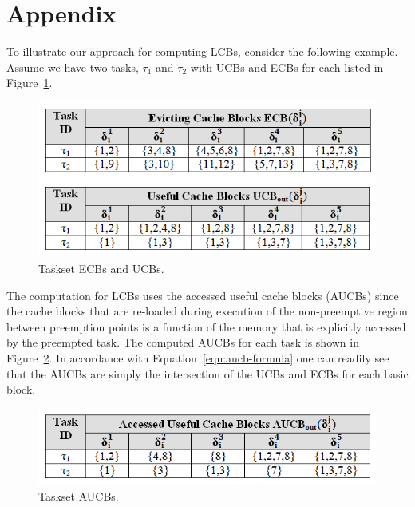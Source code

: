 %
\clearpage
%
\section{Appendix}\label{sec:appendix}

To illustrate our approach for computing LCBs, consider the following example.  Assume we have two tasks, \begin{math}\tau_{1}\end{math} and \begin{math}\tau_{2}\end{math} with UCBs and ECBs for each listed in Figure~\ref{fig:taskset_ecbs_ucbs}.
\vspace{-5pt}
\begin{figure}[h!]
\begin{center}
\includegraphics[width=\linewidth]{taskset_ecbs_ucbs.png}
\caption{Taskset ECBs and UCBs.}
\label{fig:taskset_ecbs_ucbs}
\end{center}
\end{figure}
\vspace{-10pt}
\newline
\noindent
The computation for LCBs uses the accessed useful cache blocks (AUCBs) since the cache blocks that are re-loaded during execution of the non-preemptive region between preemption points is a function of the memory that is explicitly accessed by the preempted task.  The computed AUCBs for each task is shown in Figure~\ref{fig:taskset_aucbs}. In accordance with Equation~\ref{eqn:aucb-formula} one can readily see that the AUCBs are simply the intersection of the UCBs and ECBs for each basic block.
\vspace{-5pt}
\begin{figure}[h!]
\begin{center}
\includegraphics[width=\linewidth]{taskset_aucbs.png}
\caption{Taskset AUCBs.}
\label{fig:taskset_aucbs}
\end{center}
\end{figure}
